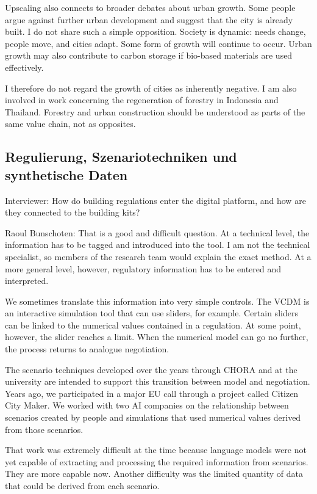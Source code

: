 Upscaling also connects to broader debates about urban growth. Some people argue against further urban development and suggest that the city is already built. I do not share such a simple opposition. Society is dynamic: needs change, people move, and cities adapt. Some form of growth will continue to occur. Urban growth may also contribute to carbon storage if bio-based materials are used effectively.

I therefore do not regard the growth of cities as inherently negative. I am also involved in work concerning the regeneration of forestry in Indonesia and Thailand. Forestry and urban construction should be understood as parts of the same value chain, not as opposites.

\subsection{Regulierung, Szenariotechniken und synthetische Daten}

Interviewer: How do building regulations enter the digital platform, and how are they connected to the building kits?

Raoul Bunschoten: That is a good and difficult question. At a technical level, the information has to be tagged and introduced into the tool. I am not the technical specialist, so members of the research team would explain the exact method. At a more general level, however, regulatory information has to be entered and interpreted.

We sometimes translate this information into very simple controls. The VCDM is an interactive simulation tool that can use sliders, for example. Certain sliders can be linked to the numerical values contained in a regulation. At some point, however, the slider reaches a limit. When the numerical model can go no further, the process returns to analogue negotiation.

The scenario techniques developed over the years through CHORA and at the university are intended to support this transition between model and negotiation. Years ago, we participated in a major EU call through a project called Citizen City Maker. We worked with two AI companies on the relationship between scenarios created by people and simulations that used numerical values derived from those scenarios.

That work was extremely difficult at the time because language models were not yet capable of extracting and processing the required information from scenarios. They are more capable now. Another difficulty was the limited quantity of data that could be derived from each scenario.

